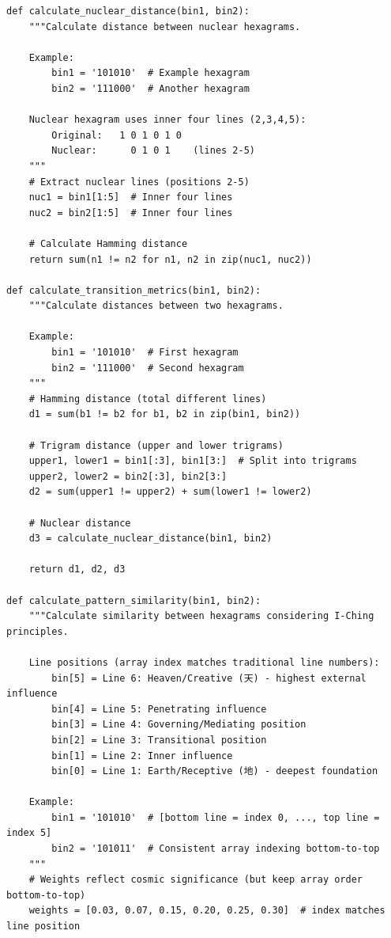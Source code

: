 \documentclass{article}
\newenvironment{Shaded}{\begin{snugshade}}{\end{snugshade}}
\begin{document}
\begin{Shaded}
\begin{verbatim}
def calculate_nuclear_distance(bin1, bin2):
    """Calculate distance between nuclear hexagrams.
    
    Example:
        bin1 = '101010'  # Example hexagram
        bin2 = '111000'  # Another hexagram
    
    Nuclear hexagram uses inner four lines (2,3,4,5):
        Original:   1 0 1 0 1 0
        Nuclear:      0 1 0 1    (lines 2-5)
    """
    # Extract nuclear lines (positions 2-5)
    nuc1 = bin1[1:5]  # Inner four lines
    nuc2 = bin2[1:5]  # Inner four lines
    
    # Calculate Hamming distance
    return sum(n1 != n2 for n1, n2 in zip(nuc1, nuc2))

def calculate_transition_metrics(bin1, bin2):
    """Calculate distances between two hexagrams.
    
    Example:
        bin1 = '101010'  # First hexagram
        bin2 = '111000'  # Second hexagram
    """
    # Hamming distance (total different lines)
    d1 = sum(b1 != b2 for b1, b2 in zip(bin1, bin2))
    
    # Trigram distance (upper and lower trigrams)
    upper1, lower1 = bin1[:3], bin1[3:]  # Split into trigrams
    upper2, lower2 = bin2[:3], bin2[3:]
    d2 = sum(upper1 != upper2) + sum(lower1 != lower2)
    
    # Nuclear distance
    d3 = calculate_nuclear_distance(bin1, bin2)
    
    return d1, d2, d3

def calculate_pattern_similarity(bin1, bin2):
    """Calculate similarity between hexagrams considering I-Ching principles.
    
    Line positions (array index matches traditional line numbers):
        bin[5] = Line 6: Heaven/Creative (天) - highest external influence
        bin[4] = Line 5: Penetrating influence
        bin[3] = Line 4: Governing/Mediating position
        bin[2] = Line 3: Transitional position
        bin[1] = Line 2: Inner influence
        bin[0] = Line 1: Earth/Receptive (地) - deepest foundation
    
    Example:
        bin1 = '101010'  # [bottom line = index 0, ..., top line = index 5]
        bin2 = '101011'  # Consistent array indexing bottom-to-top
    """
    # Weights reflect cosmic significance (but keep array order bottom-to-top)
    weights = [0.03, 0.07, 0.15, 0.20, 0.25, 0.30]  # index matches line position
    

\end{verbatim}
\end{Shaded}
\end{document}
